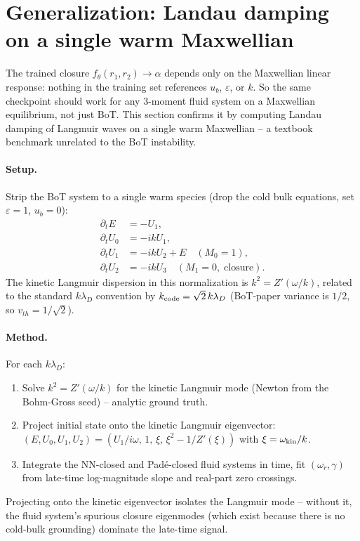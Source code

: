 \documentclass[11pt]{article}
\newcommand{\ub}{u_b}
\begin{document}
\section{Generalization: Landau damping on a single warm Maxwellian}
\label{sec:landau}

The trained closure $f_\theta(r_1, r_2) \to \alpha$ depends only on the
Maxwellian linear response: nothing in the training set references $\ub$,
$\varepsilon$, or $k$. So the same checkpoint should work for any
3-moment fluid system on a Maxwellian equilibrium, not just BoT. This
section confirms it by computing Landau damping of Langmuir waves on a
single warm Maxwellian -- a textbook benchmark unrelated to the BoT
instability.

\paragraph{Setup.} Strip the BoT system to a single warm species (drop
the cold bulk equations, set $\varepsilon = 1$, $\ub = 0$):
\begin{align*}
  \partial_t E   &= -U_1, \\
  \partial_t U_0 &= -ik U_1, \\
  \partial_t U_1 &= -ik U_2 + E   \quad (M_0 = 1), \\
  \partial_t U_2 &= -ik U_3       \quad (M_1 = 0,\;\text{closure}).
\end{align*}
The kinetic Langmuir dispersion in this normalization is $k^2 =
Z'(\omega/k)$, related to the standard $k\lambda_D$ convention by
$k_{\rm code} = \sqrt{2}\,k\lambda_D$ (BoT-paper variance is $1/2$, so
$v_{th} = 1/\sqrt{2}$).

\paragraph{Method.} For each $k\lambda_D$:
\begin{enumerate}\itemsep0pt
  \item Solve $k^2 = Z'(\omega/k)$ for the kinetic Langmuir mode (Newton from
        the Bohm-Gross seed) -- analytic ground truth.
  \item Project initial state onto the kinetic Langmuir eigenvector:
        $(E, U_0, U_1, U_2) = (U_1/i\omega,\, 1,\, \xi,\, \xi^2 - 1/Z'(\xi))$
        with $\xi = \omega_{\rm kin}/k$.
  \item Integrate the NN-closed and Pad\'e-closed fluid systems in time,
        fit $(\omega_r, \gamma)$ from late-time log-magnitude slope and
        real-part zero crossings.
\end{enumerate}
Projecting onto the kinetic eigenvector isolates the Langmuir mode --
without it, the fluid system's spurious closure eigenmodes (which exist
because there is no cold-bulk grounding) dominate the late-time signal.
\end{document}
